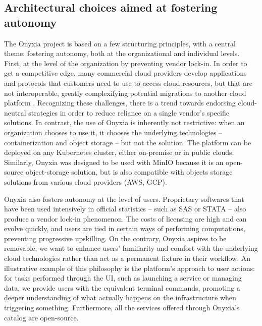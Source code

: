 \documentclass[graybox]{svmult}
\begin{document}
\subsection{Architectural choices aimed at fostering autonomy}
\label{ssec:principles}

The Onyxia project is based on a few structuring principles, with a central theme: fostering autonomy, both at the organizational and individual levels. First, at the level of the organization by preventing vendor lock-in. In order to get a competitive edge, many commercial cloud providers develop applications and protocols that customers need to use to access cloud resources, but that are not interoperable, greatly complexifying potential migrations to another cloud platform \citep{opara2016critical}. Recognizing these challenges, there is a trend towards endorsing cloud-neutral strategies \citep{opara2017holistic} in order to reduce reliance on a single vendor’s specific solutions. In contrast, the use of Onyxia is inherently not restrictive: when an organization chooses to use it, it chooses the underlying technologies -- containerization and object storage -- but not the solution. The platform can be deployed on any Kubernetes cluster, either on-premise or in public clouds. Similarly, Onyxia was designed to be used with MinIO because it is an open-source object-storage solution, but is also compatible with objects storage solutions from various cloud providers (AWS, GCP).

Onyxia also fosters autonomy at the level of users. Proprietary softwares that have been used intensively in official statistics -- such as SAS or STATA -- also produce a vendor lock-in phenomenon. The costs of licensing are high and can evolve quickly, and users are tied in certain ways of performing computations, preventing progressive upskilling. On the contrary, Onyxia aspires to be removable; we want to enhance users' familiarity and comfort with the underlying cloud technologies rather than act as a permanent fixture in their workflow. An illustrative example of this philosophy is the platform's approach to user actions: for tasks performed through the UI, such as launching a service or managing data, we provide users with the equivalent terminal commands, promoting a deeper understanding of what actually happens on the infrastructure when triggering something. Furthermore, all the services offered through Onyxia's catalog are open-source.
\end{document}
